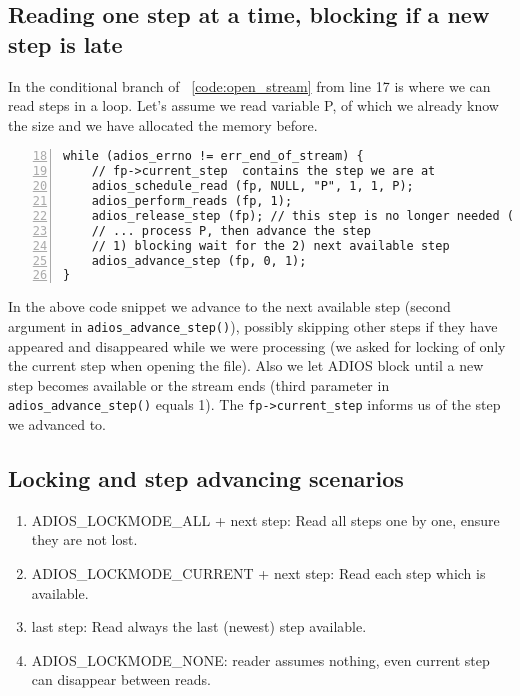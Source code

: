\subsection{Reading one step at a time, blocking if a new step is late}
In the conditional branch of \lstlistingname~\ref{code:open_stream} from line 17 is where we can read steps in a loop. Let's assume we read variable P, of which we already know the size and we have allocated the memory before.

\begin{lstlisting}[numbers=left, numberstyle=\color{gray}, stepnumber=2,firstnumber=18,
                             caption={Read a bounding box of a variable},  label=code:stream_stepbystep]
while (adios_errno != err_end_of_stream) {
    // fp->current_step  contains the step we are at
    adios_schedule_read (fp, NULL, "P", 1, 1, P);
    adios_perform_reads (fp, 1);   
    adios_release_step (fp); // this step is no longer needed (optional call)
    // ... process P, then advance the step
    // 1) blocking wait for the 2) next available step 
    adios_advance_step (fp, 0, 1);
}
\end{lstlisting}

In the above code snippet we advance to the next available step (second argument in \verb+adios_advance_step()+), possibly skipping other steps if they have appeared and disappeared while we were processing (we asked for locking of only the current step when opening the file). Also we let ADIOS block until a new step becomes available or the stream ends (third parameter in \verb+adios_advance_step()+ equals 1). The \verb+fp->current_step+ informs us of the step we advanced to.


\subsection{Locking and step advancing scenarios}
  \begin{enumerate}  
  \item ADIOS\_LOCKMODE\_ALL + next step: Read all steps one by one, ensure they are not lost. 
  \item ADIOS\_LOCKMODE\_CURRENT + next step: Read each step which is available. 
  \item last step: Read always the last (newest) step available.
  \item ADIOS\_LOCKMODE\_NONE: reader assumes nothing, even current step can disappear between reads.
  \end{enumerate}

